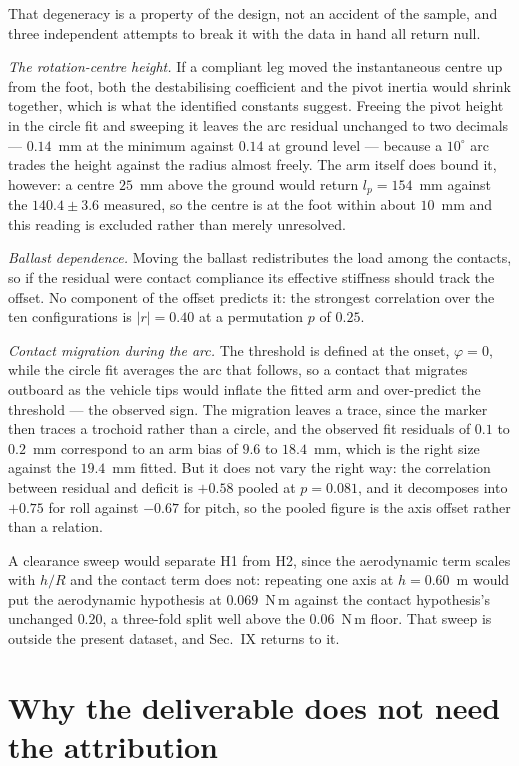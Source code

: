 \documentclass[10pt]{article}
\begin{document}
That degeneracy is a property of the design, not an accident of the
sample, and three independent attempts to break it with the data in
hand all return null.

\emph{The rotation-centre height.} If a compliant leg moved the
instantaneous centre up from the foot, both the destabilising
coefficient and the pivot inertia would shrink together, which is what
the identified constants suggest. Freeing the pivot height in the
circle fit and sweeping it leaves the arc residual unchanged to two
decimals --- $0.14$~mm at the minimum against $0.14$ at ground level
--- because a $10^\circ$ arc trades the height against the radius
almost freely. The arm itself does bound it, however: a centre $25$~mm
above the ground would return $l_p = 154$~mm against the $140.4\pm3.6$
measured, so the centre is at the foot within about $10$~mm and this
reading is excluded rather than merely unresolved.

\emph{Ballast dependence.} Moving the ballast redistributes the load
among the contacts, so if the residual were contact compliance its
effective stiffness should track the offset. No component of the
offset predicts it: the strongest correlation over the ten
configurations is $|r| = 0.40$ at a permutation $p$ of $0.25$.

\emph{Contact migration during the arc.} The threshold is defined at
the onset, $\varphi = 0$, while the circle fit averages the arc that
follows, so a contact that migrates outboard as the vehicle tips would
inflate the fitted arm and over-predict the threshold --- the observed
sign. The migration leaves a trace, since the marker then traces a
trochoid rather than a circle, and the observed fit residuals of $0.1$
to $0.2$~mm correspond to an arm bias of $9.6$ to $18.4$~mm, which is
the right size against the $19.4$~mm fitted. But it does not vary the
right way: the correlation between residual and deficit is $+0.58$
pooled at $p = 0.081$, and it decomposes into $+0.75$ for roll against
$-0.67$ for pitch, so the pooled figure is the axis offset rather than
a relation.

A clearance sweep would separate H1 from H2, since the aerodynamic term
scales with $h/R$ and the contact term does not: repeating one axis at
$h = 0.60$~m would put the aerodynamic hypothesis at $0.069$~N\,m
against the contact hypothesis's unchanged $0.20$, a three-fold split
well above the $0.06$~N\,m floor. That sweep is outside the present
dataset, and Sec.~IX returns to it.

\section*{Why the deliverable does not need the attribution}
\end{document}

